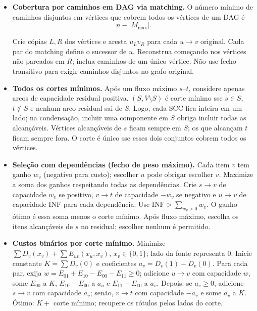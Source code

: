 \begin{itemize}[leftmargin=*,label={}]
	\item \textbf{Cobertura por caminhos em DAG via matching.}
		O número mínimo de caminhos disjuntos em vértices que cobrem todos os vértices de um DAG é
		\[
			n-|M_{\max}|.
		\]

		Crie cópias $L,R$ dos vértices e aresta $u_Lv_R$ para cada $u\to v$ original. Cada par do matching define o sucessor de $u$. Reconstrua começando nos vértices não pareados em $R$; inclua caminhos de um único vértice. Não use fecho transitivo para exigir caminhos disjuntos no grafo original.

\item \textbf{Todos os cortes mínimos.}
Após um fluxo máximo $s$--$t$, considere apenas arcos de capacidade residual positiva. $(S,V\setminus S)$ é corte mínimo sse $s\in S$, $t\notin S$ e nenhum arco residual sai de $S$. Logo, cada SCC fica inteira em um lado; na condensação, incluir uma componente em $S$ obriga incluir todas as alcançáveis. Vértices alcançáveis de $s$ ficam sempre em $S$; os que alcançam $t$ ficam sempre fora. O corte é único sse esses dois conjuntos cobrem todos os vértices.

\item \textbf{Seleção com dependências (fecho de peso máximo).}
Cada item $v$ tem ganho $w_v$ (negativo para custo); escolher $u$ pode obrigar escolher $v$. Maximize a soma dos ganhos respeitando todas as dependências. Crie $s\to v$ de capacidade $w_v$ se positivo, $v\to t$ de capacidade $-w_v$ se negativo e $u\to v$ de capacidade $\mathrm{INF}$ para cada dependência. Use $\mathrm{INF}>\sum_{w_v>0}w_v$. O ganho ótimo é essa soma menos o corte mínimo. Após fluxo máximo, escolha os itens alcançáveis de $s$ no residual; escolher nenhum é permitido.

\item \textbf{Custos binários por corte mínimo.}
Minimize $\sum D_v(x_v)+\sum E_{uv}(x_u,x_v)$, $x_v\in\{0,1\}$; lado da fonte representa 0. Inicie constante $K=\sum D_v(0)$ e coeficientes $a_v=D_v(1)-D_v(0)$. Para cada par, exija $w=E_{01}+E_{10}-E_{00}-E_{11}\ge0$; adicione $u\to v$ com capacidade $w$, some $E_{00}$ a $K$, $E_{10}-E_{00}$ a $a_u$ e $E_{11}-E_{10}$ a $a_v$. Depois: se $a_v\ge0$, adicione $s\to v$ com capacidade $a_v$; senão, $v\to t$ com capacidade $-a_v$ e some $a_v$ a $K$. Ótimo: $K+$ corte mínimo; recupere os rótulos pelos lados do corte.


\end{itemize}
